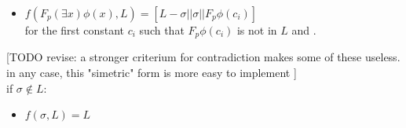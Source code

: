 {\begin{definition}
\begin{itemize}
            \item $f(F_{p} (\exists x) \phi(x), L) = [L - \sigma|| \sigma || F_{p} \phi(c_i) ]$\\ for the first constant $c_i$ such that $F_{p} \phi(c_i)$ is not in $L$ and .
        \end{itemize} [TODO revise: a stronger criterium for contradiction makes some of these useless. in any case, this "simetric" form is  more easy to implement ]\\
    if $\sigma \notin L$:
    \begin{itemize}
         \item $f(\sigma,L) = L $
    \end{itemize}
\end{definition}
}


\def\wellBehavedTheorem{
    \begin{theorem}
        Given a signed sentence list x, if x is intuitionistically valid then f(x) is intuitionistically valid 
    \end{theorem}
    \begin{proof}
        \cite{book1} proves this by using the definition of forcing. The choices of $p'$ and $c_i$ garantes the completnees of the tableaux.

        Case: if $L \ni F_{p} (\forall x) \phi(x) $ is intuitionistically valid, then there exists frame $\mathcal{C}$ that "respects" it. We take 
        a frame $\mathcal{C}'$ that is exactly like $\mathcal{C}$ with adition of a structure $p' \geq p$ such that $\mathcal{C}'(p') \nVdash \phi(c_i)$ for a new $c_i$. We now that 
        $\mathcal{C}'$ exists by the defintion of forcing for $\forall$. Also $\mathcal{C}'$ is a frame that "respects"
        $f(\forall x \phi(x), L) = [L - \sigma|| \sigma || T_{p} \phi(c_i) ]$
    \end{proof}
}

\def\TableauxDevelopmentDefinition{
    \begin{definition}
        \textbf{The tableaux Development of a Sentence } is defined inductivelly: 
        \begin{itemize}
            \item A tree with the single node $F_{\emptyset}\phi$ is a tableaux development of $\phi$. 
            \item If $\tau$ is a tableaux development of $\phi$, then $\hookleftarrow(\sigma,\tau)$ is a tableaux development of $\phi$. Where:
        \end{itemize}
    
        $\hookleftarrow(\sigma,\tau) = $ $\tau$ with $f(\sigma, l) $added to all leaves l that contain $\sigma$
    \end{definition}
}

